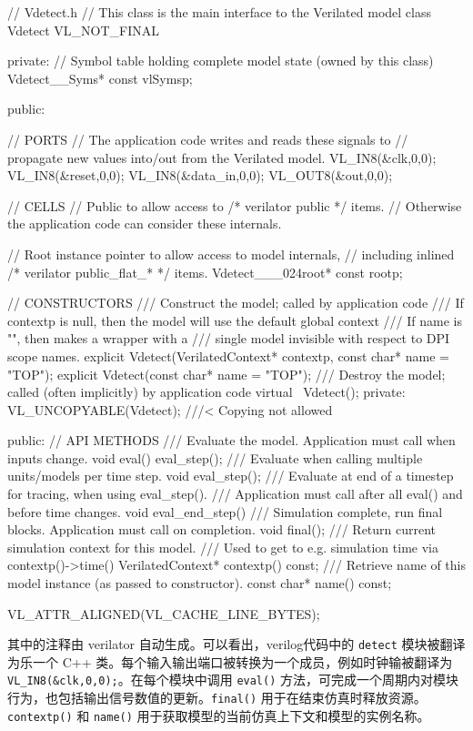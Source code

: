 \begin{CodeBlock}[language=BookCpp]
// Vdetect.h
// This class is the main interface to the Verilated model
class Vdetect VL_NOT_FINAL {
  private:
    // Symbol table holding complete model state (owned by this class)
    Vdetect__Syms* const vlSymsp;

  public:

    // PORTS
    // The application code writes and reads these signals to
    // propagate new values into/out from the Verilated model.
    VL_IN8(&clk,0,0);
    VL_IN8(&reset,0,0);
    VL_IN8(&data_in,0,0);
    VL_OUT8(&out,0,0);

    // CELLS
    // Public to allow access to /* verilator public */ items.
    // Otherwise the application code can consider these internals.

    // Root instance pointer to allow access to model internals,
    // including inlined /* verilator public_flat_* */ items.
    Vdetect___024root* const rootp;

    // CONSTRUCTORS
    /// Construct the model; called by application code
    /// If contextp is null, then the model will use the default global context
    /// If name is "", then makes a wrapper with a
    /// single model invisible with respect to DPI scope names.
    explicit Vdetect(VerilatedContext* contextp, const char* name = "TOP");
    explicit Vdetect(const char* name = "TOP");
    /// Destroy the model; called (often implicitly) by application code
    virtual ~Vdetect();
  private:
    VL_UNCOPYABLE(Vdetect);  ///< Copying not allowed

  public:
    // API METHODS
    /// Evaluate the model.  Application must call when inputs change.
    void eval() { eval_step(); }
    /// Evaluate when calling multiple units/models per time step.
    void eval_step();
    /// Evaluate at end of a timestep for tracing, when using eval_step().
    /// Application must call after all eval() and before time changes.
    void eval_end_step() {}
    /// Simulation complete, run final blocks.  Application must call on completion.
    void final();
    /// Return current simulation context for this model.
    /// Used to get to e.g. simulation time via contextp()->time()
    VerilatedContext* contextp() const;
    /// Retrieve name of this model instance (as passed to constructor).
    const char* name() const;
} VL_ATTR_ALIGNED(VL_CACHE_LINE_BYTES);
\end{CodeBlock}

其中的注释由 verilator 自动生成。可以看出，verilog代码中的 \texttt{detect} 模块被翻译为乐一个 C++ 类。每个输入输出端口被转换为一个成员，例如时钟输被翻译为 \texttt{VL\_IN8(\&clk,0,0);}。在每个模块中调用 \texttt{eval()} 方法，可完成一个周期内对模块行为，也包括输出信号数值的更新。\texttt{final()} 用于在结束仿真时释放资源。\texttt{contextp()} 和 \texttt{name()} 用于获取模型的当前仿真上下文和模型的实例名称。

